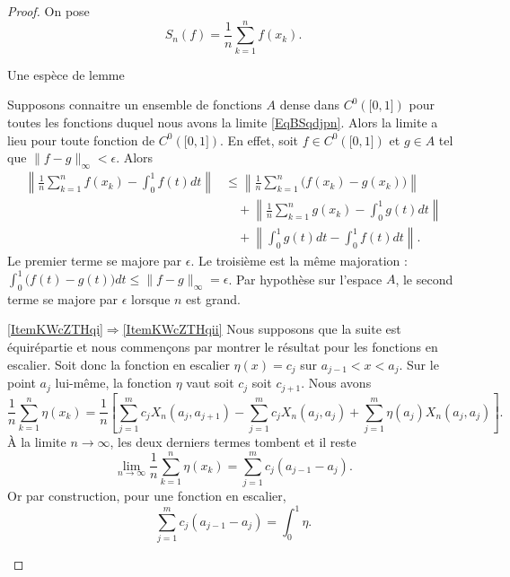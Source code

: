 \begin{proof}
    On pose
    \begin{equation}
        S_n(f)=\frac{1}{ n }\sum_{k=1}^nf(x_k).
    \end{equation}


    \begin{subproof}
    \item[Une espèce de lemme]

        Supposons connaitre un ensemble de fonctions \( A\) dense dans \( C^0(\mathopen[ 0 , 1 \mathclose])\) pour toutes les fonctions duquel nous avons la limite \eqref{EqBSqdjpn}. Alors la limite a lieu pour toute fonction de \( C^0(\mathopen[ 0 , 1 \mathclose])\). En effet, soit \( f\in C^0(\mathopen[ 0 , 1 \mathclose])\) et \( g\in A\) tel que \( \| f-g \|_{\infty}<\epsilon\). Alors
        \begin{subequations}
            \begin{align}
                \left\|   \frac{1}{ n }\sum_{k=1}^nf(x_k)-\int_0^1f(t)dt  \right\|&\leq \left\| \frac{1}{ n }\sum_{k=1}^n\big( f(x_k)-g(x_k)\big) \right\|\\
                &\quad+ \left\| \frac{1}{ n }\sum_{k=1}^n  g(x_k)-\int_0^1g(t)dt   \right\|\\
                &\quad+ \left\| \int_0^1g(t)dt-\int_0^1f(t)dt \right\|.
            \end{align}
        \end{subequations}
        Le premier terme se majore par \( \epsilon\). Le troisième est la même majoration : \( \int_0^1\big(  f(t)-g(t)\big)dt\leq \| f-g \|_{\infty}=\epsilon\). Par hypothèse sur l'espace \( A\), le second terme se majore par \( \epsilon\) lorsque \( n\) est grand.


    \item[\ref{ItemKWcZTHqi}\( \Rightarrow\)\ref{ItemKWcZTHqii}]
    Nous supposons que la suite est équirépartie et nous commençons par montrer le résultat pour les fonctions en escalier. Soit donc la fonction en escalier \( \eta(x)=c_j\) sur \( a_{j-1}< x<a_j\). Sur le point \( a_j\) lui-même, la fonction \( \eta\) vaut soit \( c_j\) soit \( c_{j+1}\). Nous avons
    \begin{equation}    \label{EqohMuel}
        \frac{1}{ n }\sum_{k=1}^n\eta(x_k)=\frac{1}{ n }\left[  \sum_{j=1}^mc_jX_n(a_j,a_{j+1})-\sum_{j=1}^mc_jX_n(a_j,a_j)+\sum_{j=1}^m\eta(a_j)X_n(a_j,a_j) \right].
    \end{equation}
    À la limite \( n\to\infty\), les deux derniers termes tombent et il reste
    \begin{equation}
        \lim_{n\to \infty} \frac{1}{ n }\sum_{k=1}^n\eta(x_k)=\sum_{j=1}^mc_j(a_{j-1}-a_j).
    \end{equation}
    Or par construction, pour une fonction en escalier,
    \begin{equation}
        \sum_{j=1}^mc_j(a_{j-1}-a_j)=\int_0^1\eta.
    \end{equation}


\end{subproof}
\end{proof}
